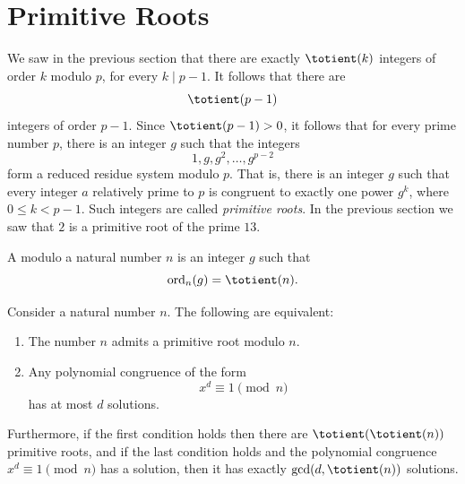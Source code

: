\section{Primitive Roots}

We saw in the previous section that there are exactly $\totient(k)$ integers of order $k$ modulo $p$, for every $k\mid p-1$. It follows that there are
\begin{equation*}
  \totient(p-1)
\end{equation*}
integers of order $p-1$. Since $\totient(p-1)>0$, it follows that for every prime number $p$, there is an integer $g$ such that the integers
\begin{equation*}
  1,g,g^2,\ldots,g^{p-2}
\end{equation*}
form a reduced residue system modulo $p$. That is, there is an integer $g$ such that every integer $a$ relatively prime to $p$ is congruent to exactly one power $g^k$, where $0\leq k<p-1$. Such integers are called \emph{primitive roots}. In the previous section we saw that $2$ is a primitive root of the prime $13$. 

\begin{definition}
  A  modulo a natural number $n$ is an integer $g$ such that
  \begin{equation*}
    \ord_n(g)=\totient(n).
  \end{equation*}
\end{definition}

\begin{theorem}\label{theorem:primitive-roots}
  Consider a natural number $n$. The following are equivalent:
  \begin{enumerate}
  \item \label{itemi:primitive-roots}The number $n$ admits a primitive root modulo $n$.
  \item \label{itemii:primitive-roots}Any polynomial congruence of the form
    \begin{equation*}
      x^d\equiv 1\pmod{n}
    \end{equation*}
    has at most $d$ solutions.
  \end{enumerate}
  Furthermore, if the first condition holds then there are $\totient(\totient(n))$ primitive roots, and if the last condition holds and the polynomial congruence $x^d\equiv 1\pmod{n}$ has a solution, then it has exactly $\gcd(d,\totient(n))$ solutions.
\end{theorem}

